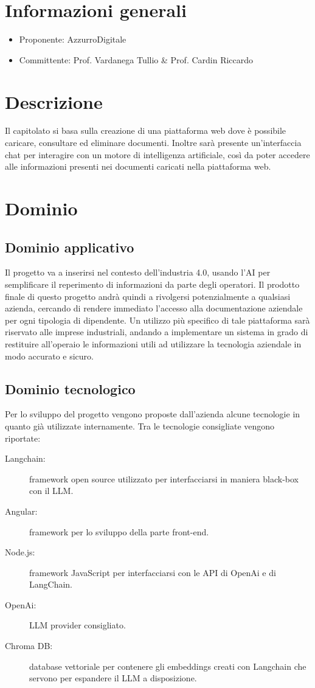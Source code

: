 \documentclass[12pt]{report}
\begin{document}
\section{Informazioni generali}
\begin{itemize}
    \item Proponente: AzzurroDigitale
    \item Committente: Prof. Vardanega Tullio \& Prof. Cardin Riccardo
\end{itemize}

\section{Descrizione}
Il capitolato si basa sulla creazione di una piattaforma web dove è possibile caricare, consultare ed eliminare documenti. Inoltre sarà presente un’interfaccia chat per interagire con un motore di intelligenza artificiale, così da poter accedere alle informazioni presenti nei documenti caricati nella piattaforma web.

\section{Dominio}
\subsection{Dominio applicativo}
Il progetto va a inserirsi nel contesto dell’industria 4.0, usando l’AI per semplificare il reperimento di informazioni da parte degli operatori. Il prodotto finale di questo progetto andrà quindi a rivolgersi potenzialmente a qualsiasi azienda, cercando di rendere immediato l’accesso alla documentazione aziendale per ogni tipologia di dipendente. Un utilizzo più specifico di tale piattaforma sarà riservato alle imprese industriali, andando a implementare un sistema in grado di restituire all’operaio le informazioni utili ad utilizzare la tecnologia aziendale in modo accurato e sicuro.

\subsection{Dominio tecnologico}
Per lo sviluppo del progetto vengono proposte dall’azienda alcune tecnologie in quanto già utilizzate internamente. 
Tra le tecnologie consigliate vengono riportate:

\begin{description}
    \item[Langchain:] framework open source utilizzato per interfacciarsi in maniera black-box con il LLM.
    \item[Angular:] framework per lo sviluppo della parte front-end.
    \item[Node.js:] framework JavaScript per interfacciarsi con le API di OpenAi e di LangChain.
    \item[OpenAi:] LLM provider consigliato.
    \item[Chroma DB:] database vettoriale per contenere gli embeddings creati con Langchain che servono per espandere il LLM a disposizione.
\end{description}
\end{document}
